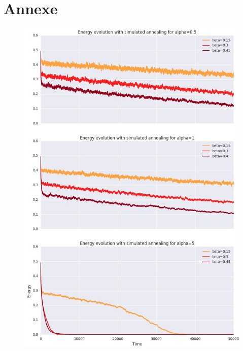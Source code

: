 \documentclass[twocolumn]{article}
\begin{document}
\section{Annexe}
\begin{figure}[!h]
	\includegraphics[width=\columnwidth]{../tobekept/skype_1.jpg}
\end{figure}
\end{document}
